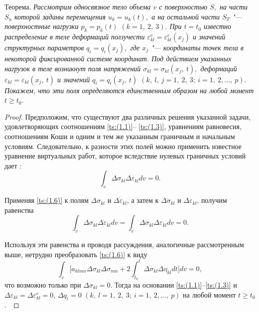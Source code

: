 \smallskip

{\small\sc Теорема.} \it 
Рассмотрим односвязное тело объема $v$  с поверхностью $S,$ на части $S_{u}$ которой заданы перемещения $u_{k}=u_{k}(t),$ 
а на остальной части $S_{T}$ "--- поверхностные нагрузки $p_{k}=p_{k}(t)$ $(k=1,\:2,\:3).$ 
При $t=t_{0}$ известно распределение в теле деформаций ползучести $\varepsilon_{kl}^{c}=\varepsilon_{kl}^{c}(x_{j})$ и значений структурных параметров $q_{i}=q_{i}(x_{j}),$ где $x_{j}$ "--- координаты точек тела в некоторой фиксированной системе координат. Под действием указанных нагрузок в теле возникнут поля напряжений $\sigma_{kl}=\sigma_{kl}(x_{j},\:t),$ деформаций $\varepsilon_{kl}=\varepsilon_{kl}(x_{j},\:t)$ и значений $q_{i}=q_{i}(x_{j},\:t)$ $(k,\:l,\:j=1,\:2,\:3;\ i=1,\:2,\ldots,\:p).$ Покажем, что эти поля определяются единственным образом на любой момент $t\geq t_{0}.$

\smallskip

\rm

\begin{proof}
Предположим, что существуют два различных решения указанной задачи, удовлетворяющих соотношениям  \eqref{ts:(1.1)}-- \eqref{ts:(1.3)}, уравнениям равновесия, соотношениям Коши и одним и тем же указанным граничным и начальным условиям. 
Следовательно, к разности этих полей можно применить известное уравнение виртуальных работ, которое вследствие нулевых граничных условий дает \cite{ts:Koiter}:
\begin{equation}
\int_{v}\Delta\sigma_{kl}\Delta\varepsilon_{kl}dv=0.
\label{ts:(1.6)}
\end{equation}

Применяя \eqref{ts:(1.6)} к полям $\Delta\sigma_{kl}$ и $\Delta\dot{\varepsilon}_{kl}$, а затем к $\Delta\dot{\sigma}_{kl}$ и $\Delta\varepsilon_{kl}$, получим равенства
$$
\int_{v}\Delta\sigma_{kl}\Delta\dot{\varepsilon}_{kl}dv=\int_{v}\Delta\dot{\sigma}_{kl}\Delta\varepsilon_{kl}dv=0.
$$

Используя эти равенства и проводя рассуждения, аналогичные рассмотренным выше, нетрудно преобразовать \eqref{ts:(1.6)} к виду
$$
\int_{v}\biggl[a_{klmn}\Delta\sigma_{kl}\Delta\sigma_{mn}+2\int_{t_{0}}^{t}\Delta\sigma_{kl}\Delta\eta_{kl}dt\biggr]dv=0,
$$
что возможно только при $\Delta\sigma_{kl}=0$. 
Тогда на основании \eqref{ts:(1.1)}--\eqref{ts:(1.3)} и $\Delta\varepsilon_{kl}=\Delta\varepsilon_{kl}^{c}=0$, $\Delta q_{i}=0$ $(k,\:l=1,\:2,\:3;\:i=1,\:2,\ldots,\:p)$ на любой момент $t\geq t_{0}$.~\end{proof}

